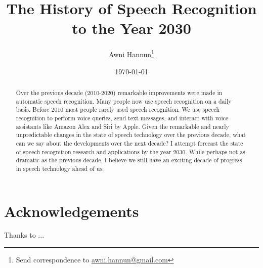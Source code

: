 \documentclass[twocolumn, 12pt]{article}
\title{The History of Speech Recognition to the Year 2030}
\author{Awni Hannun\footnote{
  Send correspondence to
  \href{mailto:awni.hannun@gmail.com}{awni.hannun@gmail.com}}}
\date{\today}
\begin{document}
\maketitle

\begin{abstract}
    Over the previous decade (2010-2020) remarkable improvements were made in
    automatic speech recognition. Many people now use speech
    recognition on a daily basis. Before 2010 most people rarely used speech
    recognition. We use speech recognition to perform voice queries, send text
    messages, and interact with voice assistants like Amazon Alex and Siri by
    Apple. Given the remarkable and nearly unpredictable changes in the state
    of speech technology over the previous decade, what can we say about the
    developments over the next decade? I attempt forecast the state of speech
    recognition research and applications by the year 2030. While perhaps not
    as dramatic as the previous decade, I believe we still have an exciting
    decade of progress in speech technology ahead of us.
\end{abstract}






\section*{\large Acknowledgements}
Thanks to ...



\end{document}
